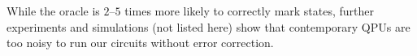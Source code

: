\documentclass[reqno, 10pt]{amsart}
\numberwithin{equation}{section}                %
\begin{document}
While the oracle is $2$--$5$ times more likely to correctly mark states, further experiments and simulations (not listed here) show that contemporary QPUs are too noisy to run our circuits without error correction.

\end{document}
